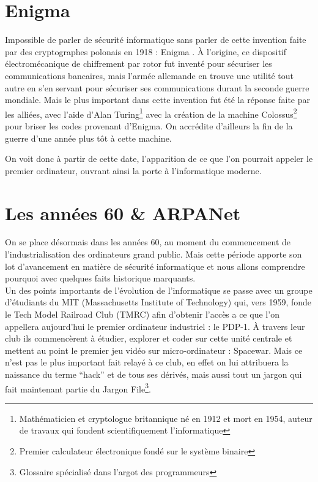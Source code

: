 \documentclass[a4paper]{memoir}
\begin{document}
\section{Enigma}

Impossible de parler de sécurité informatique sans parler de cette invention faite par des cryptographes polonais en 1918 : Enigma .
À l'origine, ce dispositif électromécanique de chiffrement par rotor fut inventé pour sécuriser les communications bancaires, mais l'armée allemande en trouve une utilité tout autre en s'en servant pour sécuriser ses communications durant la seconde guerre mondiale. Mais le plus important dans cette invention fut été la réponse faite par les alliées, avec l'aide d'Alan Turing\footnote{Mathématicien et cryptologue britannique né en 1912 et mort en 1954, auteur de travaux qui fondent scientifiquement l'informatique} avec la création de la machine Colossus\footnote{Premier calculateur électronique fondé sur le système binaire} pour briser les codes provenant d'Enigma. On accrédite d'ailleurs la fin de la guerre d'une année plus tôt à cette machine.

On voit donc à partir de cette date, l'apparition de ce que l'on pourrait appeler le premier ordinateur, ouvrant ainsi la porte à l'informatique moderne.

\section{Les années 60 \& ARPANet}

On se place désormais dans les années 60, au moment du commencement de l'industrialisation des ordinateurs grand public. Mais cette période apporte son lot d'avancement en matière de sécurité informatique et nous allons comprendre pourquoi avec quelques faits historique marquants.\\

Un des points importants de l'évolution de l'informatique se passe avec un groupe d'étudiants du MIT (Massachusetts Institute of Technology) qui, vers 1959, fonde le Tech Model Railroad Club (TMRC) afin d'obtenir l'accès a ce que l'on appellera aujourd'hui le premier ordinateur industriel : le PDP-1. À travers leur club ils commencèrent à étudier, explorer et coder sur cette unité centrale et mettent au point le premier jeu vidéo sur micro-ordinateur : Spacewar. Mais ce n'est pas le plus important fait relayé à ce club, en effet on lui attribuera la naissance du terme ``hack'' et de tous ses dérivés, mais aussi tout un jargon qui fait maintenant partie du Jargon File\footnote{Glossaire spécialisé dans l'argot des programmeurs}.\\
\end{document}
